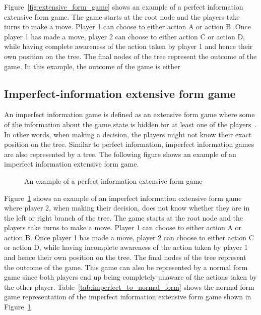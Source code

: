 Figure~\ref{fig:extensive_form_game} shows an example of a perfect information
extensive form game.
The game starts at the root node and the players take turns to make a move.
Player 1 can choose to either action A or action B.
Once player 1 has made a move, player 2 can choose to either action C or action
D, while having complete awareness of the action taken by player 1 and hence
their own position on the tree.
The final nodes of the tree represent the outcome of the game.
In this example, the outcome of the game is either 

\subsection{Imperfect-information extensive form game}
\label{sec:game_imperfect_information}

An imperfect information game is defined as an extensive form game where some
of the information about the game state is hidden for at least one of the
players~\cite{Berwanger2008}.
In other words, when making a decision, the players might not know their exact
position on the tree.
Similar to perfect information, imperfect information games are also represented
by a tree.
The following figure shows an example of an imperfect information extensive
form game.

\begin{figure}[H]
    \centering
    
    \caption{An example of a perfect information extensive form game}
    \label{fig:imperfect_extensive_form_game}
\end{figure}

Figure~\ref{fig:imperfect_extensive_form_game} shows an example of an imperfect
information extensive form game where player 2, when making their decision,
does not know whether they are in the left or right branch of the tree.
The game starts at the root node and the players take turns to make a move.
Player 1 can choose to either action A or action B.
Once player 1 has made a move, player 2 can choose to either action C or action
D, while having incomplete awareness of the action taken by player 1 and hence
their own position on the tree.
The final nodes of the tree represent the outcome of the game.
This game can also be represented by a normal form game since both players end
up being completely unaware of the actions taken by the other player.
Table~\ref{tab:imperfect_to_normal_form} shows the normal form game
representation of the imperfect information extensive form game shown in
Figure~\ref{fig:imperfect_extensive_form_game}.


